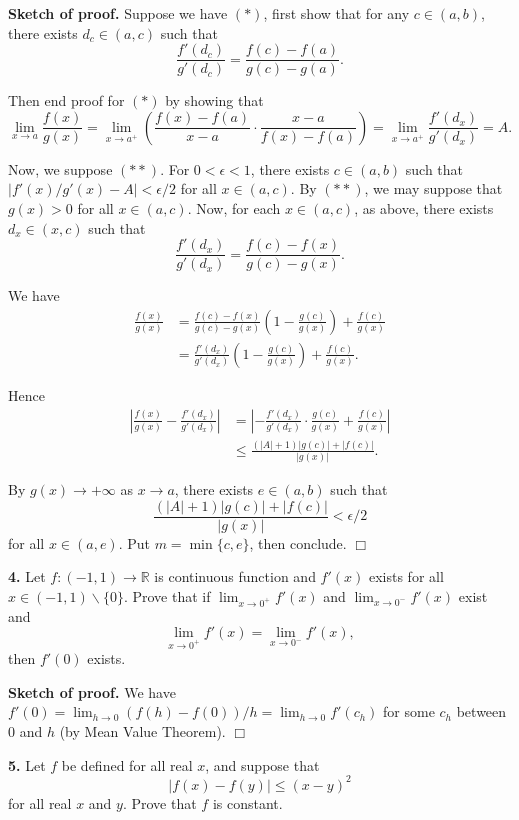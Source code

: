 \documentclass{article}
\begin{document}
    \textbf{Sketch of proof.} Suppose we have $(*)$, first show that for any
$c\in (a,b)$, there exists $d_c \in (a,c)$ such that
\[\frac{f'(d_c)}{g'(d_c)} = \frac{f(c) - f(a)}{g(c) - g(a)}.\]

Then end proof for $(*)$ by showing that
\[\lim_{x \to a} \frac{f(x)}{g(x)} = \lim_{x \to a^+} \left(\frac{f(x) - f(a)}{x-a}\cdot \frac{x-a}{f(x) - f(a)} \right)= \lim_{x\to a^+}\frac{f'(d_x)}{g'(d_x)} = A.\]

Now, we suppose $(**)$. For $0<\epsilon < 1$, there exists $c \in (a,b)$
such that $|f'(x)/g'(x) - A| < \epsilon/2$ for all $x\in (a,c)$. By
$(**)$, we may suppose that $g(x) > 0$ for all $x\in (a,c)$. Now, for
each $x \in (a,c)$, as above, there exists $d_x \in (x,c)$ such that
\[\frac{f'(d_x)}{g'(d_x)} = \frac{f(c) - f(x)}{g(c) - g(x)}.\]

We have \[\begin{aligned}
\frac{f(x)}{g(x)} &= \frac{f(c) - f(x)}{g(c) - g(x)}\left(1 - \frac{g(c)}{g(x) }\right) + \frac{f(c)}{g(x)}\\
&=\frac{f'(d_x)}{g'(d_x)}\left(1 - \frac{g(c)}{g(x) }\right) + \frac{f(c)}{g(x)} .
\end{aligned}\]

Hence \[\begin{aligned}
\left|\frac{f(x)}{g(x)} - \frac{f'(d_x)}{g'(d_x)}\right|&= \left|-\frac{f'(d_x)}{g'(d_x)}\cdot \frac{g(c)}{g(x)} + \frac{f(c)}{g(x)}\right|\\
&\le \frac{ (|A| + 1)|g(c)|+ |f(c)|}{|g(x)|}.
\end{aligned}\]

By $g(x) \to +\infty$ as $x \to a$, there exists $e \in (a,b)$ such that
\[ \frac{ (|A| + 1)|g(c)|+ |f(c)|}{|g(x)|} < \epsilon /2\] for all
$x \in (a,e)$. Put $m = \min \{c,e\}$, then conclude. $\Box$

    \textbf{4.} Let $f:(-1,1)\to \mathbb{R}$ is continuous function and
$f'(x)$ exists for all $x\in (-1,1)\backslash \{0\}$. Prove that if
$\lim_{x\to 0^+} f'(x)$ and $\lim_{x\to 0^-} f'(x)$ exist and
\[\lim_{x\to 0^+} f'(x) = \lim_{x\to 0^-} f'(x),\] then $f'(0)$ exists.

    \textbf{Sketch of proof.} We have
$f'(0) = \lim_{h\to 0}(f(h)-f(0))/h = \lim_{h\to 0} f'(c_h)$ for some
$c_h$ between $0$ and $h$ (by Mean Value Theorem). $\Box$

    \textbf{5.} Let $f$ be defined for all real $x$, and suppose that
\[|f(x) - f(y)| \le (x-y)^2\] for all real $x$ and $y$. Prove that $f$
is constant.
\end{document}
